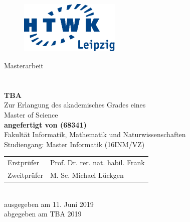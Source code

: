 \makeatletter
\begin{titlepage}
  \vspace{1cm}

  \begin{figure}[h!]
    \centering
    \includegraphics[height=2.5cm]{assets/htwk_logo.pdf}
  \end{figure}

  \begin{center}
    \vspace{1cm}

    \begin{onehalfspacing}
      {\Large Masterarbeit} \\[8ex]
      \textbf{
        {\Huge \@title} \\[5ex]
        {\Large \@subtitle} \\[2ex]
        {\Large TBA } \\[8ex]
      }
      \large
      Zur Erlangung des akademisches Grades eines \\
      Master of Science \\[5ex]
      \vfill
      \textbf{angefertigt von \@author{ }(68341)}\\[5ex]
      \vfill
      Fakultät Informatik, Mathematik und Naturwissenschaften\\
      Studiengang: Master Informatik (16INM/VZ)\\[5ex]
      \vfill
      \begin{tabular}{ll}
          Erstprüfer & Prof. Dr. rer. nat. habil. Frank\\
          Zweitprüfer & M. Sc. Michael Lückgen
      \end{tabular} \\[5ex]
      \vfill
      ausgegeben am 11. Juni 2019 \\
      abgegeben am TBA 2019
    \end{onehalfspacing}
  \end{center}
\end{titlepage}
\makeatother

